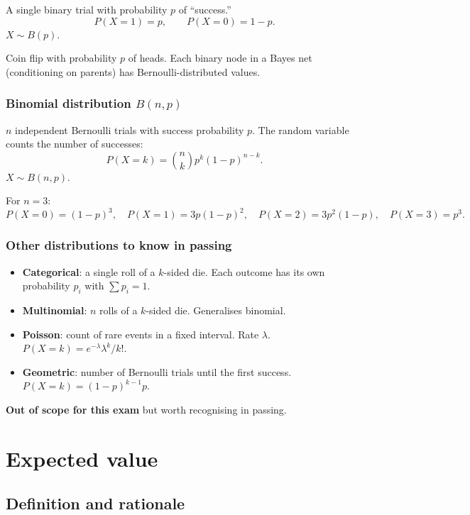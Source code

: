 \documentclass[11pt, a4paper]{article}
\begin{document}
A single binary trial with probability $p$ of ``success.''
\[
P(X = 1) = p, \qquad P(X = 0) = 1 - p.
\]
$X \sim B(p)$.

Coin flip with probability $p$ of heads. Each binary node in a Bayes net (conditioning on parents) has Bernoulli-distributed values.

\subsubsection*{Binomial distribution $B(n, p)$}

$n$ independent Bernoulli trials with success probability $p$. The random variable counts the number of successes:
\[
P(X = k) = \binom{n}{k} p^k (1 - p)^{n - k}.
\]
$X \sim B(n, p)$.

For $n = 3$:
\[
P(X = 0) = (1-p)^3, \quad P(X = 1) = 3 p (1-p)^2, \quad P(X = 2) = 3 p^2 (1-p), \quad P(X = 3) = p^3.
\]

\subsubsection*{Other distributions to know in passing}

\begin{itemize}
  \item \textbf{Categorical}: a single roll of a $k$-sided die. Each outcome has its own probability $p_i$ with $\sum p_i = 1$.
  \item \textbf{Multinomial}: $n$ rolls of a $k$-sided die. Generalises binomial.
  \item \textbf{Poisson}: count of rare events in a fixed interval. Rate $\lambda$. $P(X = k) = e^{-\lambda} \lambda^k / k!$.
  \item \textbf{Geometric}: number of Bernoulli trials until the first success. $P(X = k) = (1-p)^{k-1} p$.
\end{itemize}

\textbf{Out of scope for this exam} but worth recognising in passing.

\section{Expected value}

\subsection{Definition and rationale}
\end{document}
